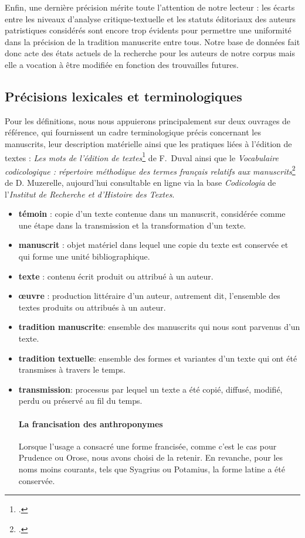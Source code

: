 \documentclass[a4paper,twoside,12pt]{book}
\begin{document}
Enfin, une dernière précision mérite toute l’attention de notre lecteur : les écarts entre les niveaux d’analyse critique-textuelle et les statuts éditoriaux des auteurs patristiques considérés sont encore trop évidents pour permettre une uniformité dans la précision de la tradition manuscrite entre tous. Notre base de données fait donc acte des états actuels de la recherche pour les auteurs de notre corpus mais elle a vocation à être modifiée en fonction des trouvailles futures. 

\subsection{Précisions lexicales et terminologiques}

 Pour les définitions, nous nous appuierons principalement sur deux ouvrages de référence, qui fournissent un cadre terminologique précis concernant les manuscrits, leur description matérielle ainsi que les pratiques liées à l’édition de textes : \textit{Les mots de l’édition de textes}\footcite{duval} de F.~Duval ainsi que le \textit{Vocabulaire codicologique : répertoire méthodique des termes français relatifs aux manuscrits}\footcite{muzerelle} de D. Muzerelle, aujourd’hui consultable en ligne via la base \textit{Codicologia} de l’\textit{Institut de Recherche et d'Histoire des Textes}. 

\begin{itemize}
	\item \textbf{témoin} : copie d'un texte contenue dans un manuscrit, considérée comme une étape dans la transmission et la transformation d'un texte.
	\item \textbf{manuscrit} : objet matériel dans lequel une copie du texte est conservée et qui forme une unité bibliographique.
    \item \textbf{texte} : contenu écrit produit ou attribué à un auteur.
    \item \textbf{œuvre} : production littéraire d'un auteur, autrement dit,  l'ensemble des textes produits ou attribués à un auteur.
	\item \textbf{tradition manuscrite}: ensemble des manuscrits qui nous sont parvenus d'un texte.
	 \item \textbf{tradition textuelle}: ensemble des formes et variantes d’un texte qui ont été transmises à travers le temps.
	\item \textbf{transmission}: processus par lequel un texte a été copié, diffusé, modifié, perdu ou préservé au fil du temps.
	
\paragraph{La francisation des anthroponymes} Lorsque l'usage a consacré une forme francisée, comme c’est le cas pour Prudence ou Orose, nous avons choisi de la retenir. En revanche, pour les noms moins courants, tels que Syagrius ou Potamius, la forme latine a été conservée.


	
\end{itemize}
\end{document}
